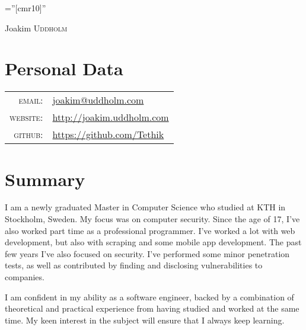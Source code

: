 \documentclass[a4paper,10pt]{article}
\begin{document}
\pagestyle{empty} %

\font\fb=''[cmr10]'' %

\par{\centering
		{\Huge Joakim \textsc{Uddholm}
	}\bigskip\par}

\section{Personal Data}


\begin{tabular}{rl}
    \textsc{email:}     & \href{mailto:joakim@uddholm.com}{joakim@uddholm.com}\\
    \textsc{website:}   & \href{http://joakim.uddholm.com}{http://joakim.uddholm.com}\\    
    \textsc{github:}   & \href{https://github.com/Tethik}{https://github.com/Tethik}\\    
\end{tabular}

\section{Summary}
I am a newly graduated Master in Computer Science who studied at KTH in Stockholm, Sweden. My focus was on computer security. Since the age of 17, I've also worked part time as a professional programmer. I've worked a lot with web development, but also with scraping and some mobile app development. The past few years I've also focused on security. I've performed some minor penetration tests, as well as contributed by finding and disclosing vulnerabilities to companies. 

I am confident in my ability as a software engineer, backed by a combination of theoretical and practical experience from having studied and worked at the same time. My keen interest in the subject will ensure that I always keep learning.



\end{document}
